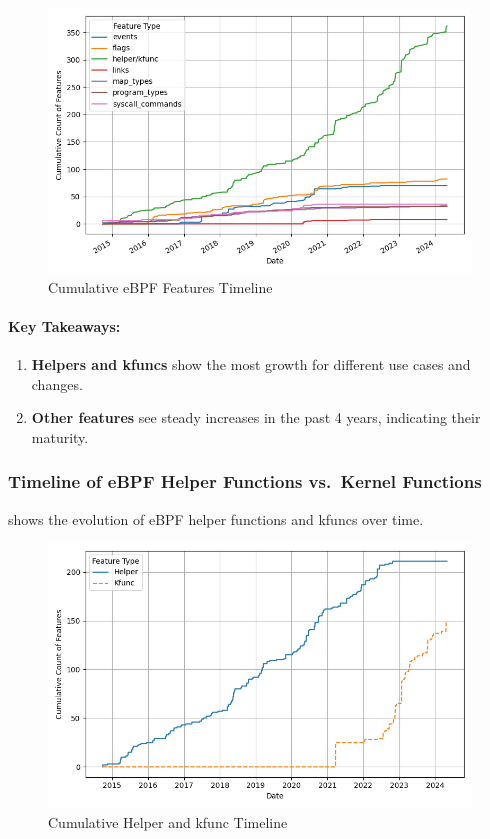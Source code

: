 \begin{figure}[ht]
    \centering
    \includegraphics[width=\linewidth]{feature-analysis/cumulative_bpf_features_timeline.png}
    \caption{Cumulative eBPF Features Timeline}
    \label{fig:cumulative_feature_timeline}
\end{figure}

\paragraph{Key Takeaways:}

\begin{enumerate}
    \item \textbf{Helpers and kfuncs} show the most growth for different use cases and changes.
    \item \textbf{Other features} see steady increases in the past 4 years, indicating their maturity.
\end{enumerate}

\subsubsection{Timeline of eBPF Helper Functions vs.\ Kernel Functions}

 shows the evolution of eBPF helper functions and kfuncs over time. 

\begin{figure}[ht]
    \centering
    \includegraphics[width=\linewidth]{feature-analysis/cumulative_helper_kfunc_timeline.png}
    \caption{Cumulative Helper and kfunc Timeline}
    \label{fig:cumulative_helper_kfunc_timeline}
\end{figure}

